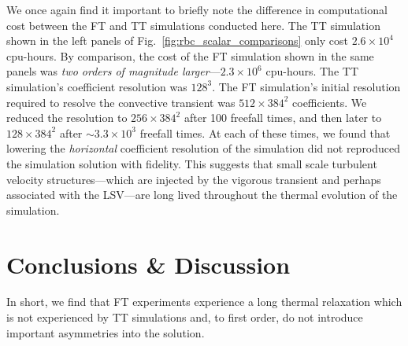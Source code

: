 \documentclass[aps, pre, onecolumn, nofootinbib, notitlepage, groupedaddress, amsfonts, amssymb, amsmath, longbibliography, superscriptaddress]{revtex4-1}
\begin{document}
We once again find it important to briefly note the difference in computational cost between the FT and TT simulations conducted here.
The TT simulation shown in the left panels of Fig.~\ref{fig:rbc_scalar_comparisons} only cost $2.6 \times 10^4$ cpu-hours.
By comparison, the cost of the FT simulation shown in the same panels was \emph{two orders of magnitude larger}---$2.3 \times 10^6$ cpu-hours.
The TT simulation's coefficient resolution was $128^3$.
The FT simulation's initial resolution required to resolve the convective transient was $512\times384^2$ coefficients.
We reduced the resolution to $256\times384^2$ after 100 freefall times, and then later to $128\times384^2$ after $\sim3.3 \times 10^3$ freefall times.
At each of these times, we found that lowering the \emph{horizontal} coefficient resolution of the simulation did not reproduced the simulation solution with fidelity.
This suggests that small scale turbulent velocity structures---which are injected by the vigorous transient and perhaps associated with the LSV---are long lived throughout the thermal evolution of the simulation.



\section{Conclusions \& Discussion}
\label{sec:discussion}
In short, we find that FT experiments experience a long thermal relaxation which is not experienced by TT simulations and, to first order, do not introduce important asymmetries into the solution.
\end{document}
